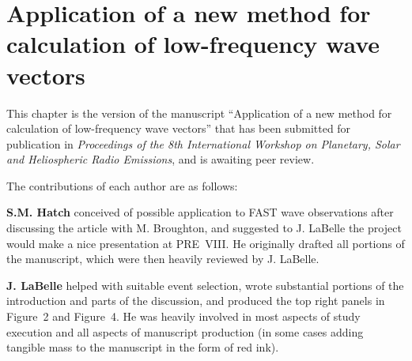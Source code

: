 
\chapter{Application of a new method for calculation of low-frequency
  wave vectors}
\label{chp:5}

This chapter is the version of the manuscript ``Application of a new
method for calculation of low-frequency wave vectors'' that has been
submitted for publication in \textsl{Proceedings of the 8th
  International Workshop on Planetary, Solar and Heliospheric Radio
  Emissions}, and is awaiting peer review.

The contributions of each author are as follows:

\textbf{S.M. Hatch} conceived of possible application to FAST \Alf
wave observations after discussing the article with M. Broughton, and
suggested to J. LaBelle the project would make a nice presentation at
PRE~VIII. He originally drafted all portions of the manuscript, which
were then heavily reviewed by J. LaBelle.

\textbf{J. LaBelle} helped with suitable event selection, wrote
substantial portions of the introduction and parts of the discussion,
and produced the top right panels in Figure~2 and Figure~4. He was
heavily involved in most aspects of study execution and all aspects of
manuscript production (in some cases adding tangible mass to the
manuscript in the form of red ink).

